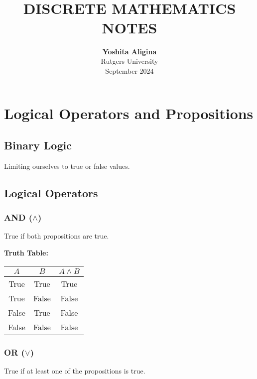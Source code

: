 \documentclass{article}
\title{ \normalsize \textsc{}
		\\ [2.0cm]
		\HRule{1.5pt} \\
		\LARGE \textbf{\uppercase{Discrete Mathematics Notes}
		\HRule{2.0pt} \\ [0.6cm]  \vspace*{10\baselineskip}}
		}
\date{}
\author{\textbf{Yoshita Aligina} \\ 
		Rutgers University \\ 
		September 2024}
\begin{document}
\maketitle
\newpage

\tableofcontents
\newpage




\section{Logical Operators and Propositions}

\subsection{Binary Logic}
Limiting ourselves to true or false values.

\subsection{Logical Operators}

\subsubsection{AND ($\land$)}
True if both propositions are true.

\textbf{Truth Table:}
\begin{center}
    \begin{tabular}{|c|c|c|}
        \hline
        $A$ & $B$ & $A \land B$ \\
        \hline
        True & True & True \\
        True & False & False \\
        False & True & False \\
        False & False & False \\
        \hline
    \end{tabular}
\end{center}

\subsubsection{OR ($\lor$)}
True if at least one of the propositions is true.
\end{document}
